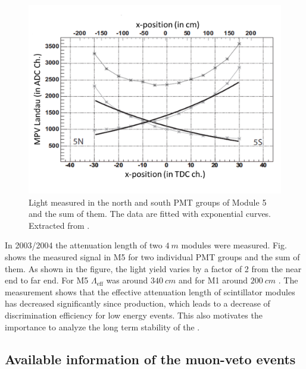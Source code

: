 \begin{figure}[ht!]
  \centering
  \includegraphics[width=0.6\textwidth{}]{./fig/pos-dependent.png}
  \caption{Light measured in the north and south PMT groups of Module 5 and the sum of them. The data are fitted with exponential curves. Extracted from \cite{Hab04}.}
  \label{fig:pos-dependent}
\end{figure}

In 2003/2004 the attenuation length of two $\SI{4}{m}$ modules were measured. Fig. shows the measured signal in M5 for two individual PMT groups and the sum of them. As shown in the figure, the light yield varies by a factor of 2 from the near end to far end.
For M5 $\Lambda_{\mathrm{eff}}$ was around $\SI{340}{cm}$ and for M1 around $\SI{200}{cm}$ \cite{Hab04}. The measurement shows that the effective attenuation length of scintillator modules has decreased significantly since production, which leads to a decrease of discrimination efficiency for low energy events. This also motivates the importance to analyze the long term stability of the \mvs.


\subsection{Available information of the muon-veto events}

